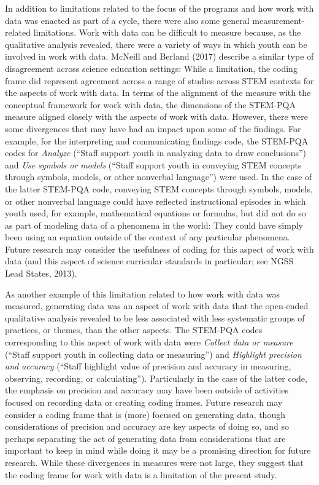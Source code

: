 \documentclass[]{msu-thesis}
\theoremstyle{definition}
\theoremstyle{definition}
\theoremstyle{definition}
\theoremstyle{remark}
\begin{document}
In addition to limitations related to the focus of the programs and how
work with data was enacted as part of a cycle, there were also some
general measurement-related limitations. Work with data can be difficult
to measure because, as the qualitative analysis revealed, there were a
variety of ways in which youth can be involved in work with data.
McNeill and Berland (2017) describe a similar type of disagreement
across science education settings: While a limitation, the coding frame
did represent agreement across a range of studies across STEM contexts
for the aspects of work with data. In terms of the alignment of the
measure with the conceptual framework for work with data, the dimensions
of the STEM-PQA measure aligned closely with the aspects of work with
data. However, there were some divergences that may have had an impact
upon some of the findings. For example, for the interpreting and
communicating findings code, the STEM-PQA codes for \emph{Analyze}
(``Staff support youth in analyzing data to draw conclusions'') and
\emph{Use symbols or models} (``Staff support youth in conveying STEM
concepts through symbols, models, or other nonverbal language'') were
used. In the case of the latter STEM-PQA code, conveying STEM concepts
through symbols, models, or other nonverbal language could have
reflected instructional episodes in which youth used, for example,
mathematical equations or formulas, but did not do so as part of
modeling data of a phenomena in the world: They could have simply been
using an equation outside of the context of any particular phenomena.
Future research may consider the usefulness of coding for this aspect of
work with data (and this aspect of science curricular standards in
particular; see NGSS Lead States, 2013).

As another example of this limitation related to how work with data was
measured, generating data was an aspect of work with data that the
open-ended qualitative analysis revealed to be less associated with less
systematic groups of practices, or themes, than the other aspects. The
STEM-PQA codes corresponding to this aspect of work with data were
\emph{Collect data or measure} (``Staff support youth in collecting data
or measuring'') and \emph{Highlight precision and accuracy} (``Staff
highlight value of precision and accuracy in measuring, observing,
recording, or calculating''). Particularly in the case of the latter
code, the emphasis on precision and accuracy may have been outside of
activities focused on recording data or creating coding frames. Future
research may consider a coding frame that is (more) focused on
generating data, though considerations of precision and accuracy are key
aspects of doing so, and so perhaps separating the act of generating
data from considerations that are important to keep in mind while doing
it may be a promising direction for future research. While these
divergences in measures were not large, they suggest that the coding
frame for work with data is a limitation of the present study.
\end{document}
